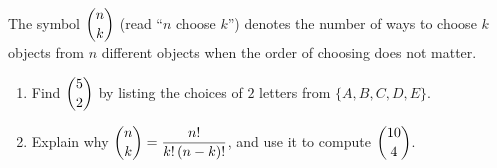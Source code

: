 The symbol $\dbinom{n}{k}$ (read ``$n$ choose $k$'') denotes the number of ways to choose $k$ objects from $n$ different objects when the order of choosing does not matter.
\begin{enumerate}
\item[(a)] Find $\dbinom52$ by listing the choices of $2$ letters from $\{A,B,C,D,E\}$.
\item[(b)] Explain why $\dbinom nk=\dfrac{n!}{k!\,(n-k)!}$, and use it to compute $\dbinom{10}{4}$.
\end{enumerate}
